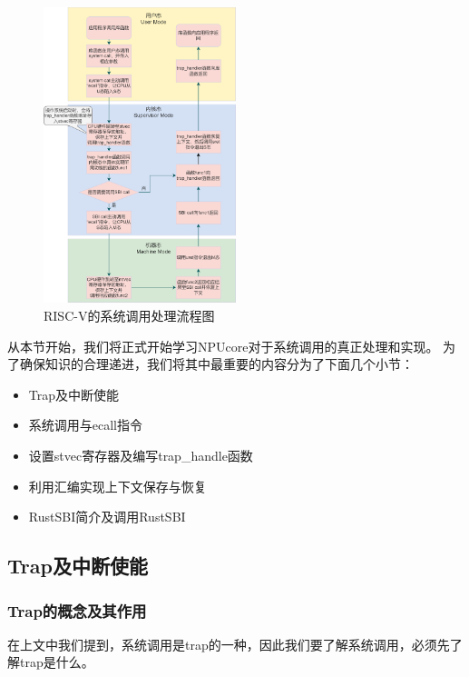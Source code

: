 \begin{figure}[htb]
    \centering
    \includegraphics[width=0.5\textwidth]{figures/03-03-RISC-V的系统调用处理流程图.png}
    \caption{
        RISC-V的系统调用处理流程图
    }
    \label{fig:RISC-V的系统调用处理流程图}
\end{figure}

从本节开始，我们将正式开始学习NPUcore对于系统调用的真正处理和实现。
为了确保知识的合理递进，我们将其中最重要的内容分为了下面几个小节：

\begin{itemize}
    \item Trap及中断使能
    \item 系统调用与ecall指令
    \item 设置stvec寄存器及编写trap_handle函数
    \item 利用汇编实现上下文保存与恢复
    \item RustSBI简介及调用RustSBI
\end{itemize}

\subsection{Trap及中断使能}

\subsubsection{Trap的概念及其作用}

在上文中我们提到，系统调用是trap的一种，因此我们要了解系统调用，必须先了解trap是什么。

